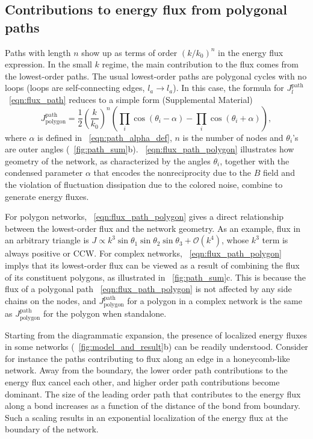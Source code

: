 \documentclass[
 preprint,
 preprintnumbers,
 amsmath,amssymb,
 aps,
 pre,
 longbibliography,
 superscriptaddress,
 10pt, twocolumn
]{revtex4-1}
\begin{document}
\subsection{Contributions to energy flux from polygonal paths}
Paths with length $n$ show up as terms of order $(k/k_0)^n$ in the energy flux expression. In the small $k$ regime, the main contribution to the flux comes from the lowest-order paths.
The usual lowest-order paths are polygonal cycles with no loops (loops are self-connecting edges, $l_a\rightarrow l_a$). In this case, the formula for $J^\text{path}_l$ \eqnname~\eqref{eqn:flux_path} reduces to a simple form (Supplemental Material)
\begin{equation} \label{eqn:flux_path_polygon}
    J^\text{path}_\text{polygon} = \frac{1}{2} (\frac{k}{k_0})^n (\prod_i \cos(\theta_i - \alpha) - \prod_i \cos(\theta_i + \alpha)),
\end{equation}
where $\alpha$ is defined in \eqnname~\eqref{eqn:path_alpha_def}, $n$ is the number of nodes and $\theta_i$'s are outer angles (\figurename~\ref{fig:path_sum}b).
\eqnname~\ref{eqn:flux_path_polygon} illustrates how geometry of the network, as characterized by the angles $\theta_i$, together with the condensed parameter $\alpha$ that encodes the nonreciprocity due to the $B$ field and the violation of fluctuation dissipation due to the colored noise, combine to generate energy fluxes.

For polygon networks, \eqnname~\eqref{eqn:flux_path_polygon} gives a direct relationship between the lowest-order flux and the network geometry. As an example, flux in an arbitrary triangle is $J \propto k^3 \sin\theta_1\sin\theta_2\sin\theta_3 + \mathcal{O}(k^4)$, whose $k^3$ term is always positive or CCW.
For complex networks, \eqnname~\eqref{eqn:flux_path_polygon} implys that its lowest-order flux can be viewed as a result of combining the flux of its constituent polygons, as illustrated in \figurename~\ref{fig:path_sum}c. This is because the flux of a polygonal path \eqnname~\eqref{eqn:flux_path_polygon} is not affected by any side chains on the nodes, and $J^\text{path}_\text{polygon}$ for a polygon in a complex network is the same as $J^\text{path}_\text{polygon}$ for the polygon when standalone.

Starting from the  diagrammatic expansion, the presence of localized energy fluxes in some networks (\figurename~\ref{fig:model_and_result}b) can be readily understood. Consider for instance the paths contributing to flux along an edge in a honeycomb-like network. Away from the boundary, the lower order path contributions to the energy flux cancel each other, and higher order path contributions become dominant. The size of the leading order path that contributes to the energy flux along a bond increases as a function of the distance of the bond from boundary. Such a scaling results in an exponential localization of the energy flux at the boundary of the network.
\end{document}
